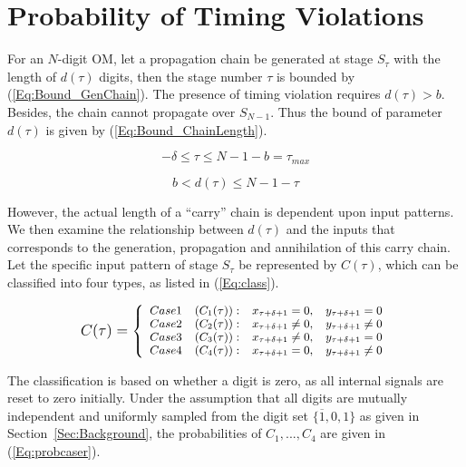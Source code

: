 \documentclass[journal]{IEEEtran}
\begin{document}
\section{Probability of Timing Violations}\label{section:Prob}

For an $N$-digit OM, let a propagation chain be generated at stage $S_{\tau}$ with the length of $d(\tau)$ digits, then the stage number $\tau$ is bounded by (\ref{Eq:Bound_GenChain}). The presence of timing violation requires $d(\tau)>b$. Besides, the chain cannot propagate over $S_{N-1}$. Thus the bound of parameter $d(\tau)$ is given by (\ref{Eq:Bound_ChainLength}).


\begin{equation}\label{Eq:Bound_GenChain}
 -\delta\leq \tau\leq N-1-b=\tau_{max}
\end{equation}


\begin{equation}\label{Eq:Bound_ChainLength}
  b<d(\tau)\leq N-1-\tau
\end{equation}
%


\noindent However, the actual length of a ``carry'' chain is dependent upon input patterns. We then examine the relationship between $d(\tau)$ and the inputs that corresponds to the generation, propagation and annihilation of this carry chain.  Let the specific input pattern of stage $S_{\tau}$ be represented by $C(\tau)$, which can be classified into four types, as listed in (\ref{Eq:class}). 

\begin{equation}\label{Eq:class}
\footnotesize
    C(\tau)= \left\{ \begin{array}{llll}
        Case 1 & (C_1(\tau)): & x_{\tau +\delta+1}=0, & y_{\tau +\delta+1}=0\\
        Case 2 & (C_2(\tau)): & x_{\tau +\delta+1}\neq 0, & y_{\tau +\delta+1}\neq 0\\
        Case 3 & (C_3(\tau)): & x_{\tau +\delta+1}\neq 0, & y_{\tau +\delta+1}=0\\
        Case 4 & (C_4(\tau)): & x_{\tau +\delta+1}=0, & y_{\tau +\delta+1}\neq 0
\end{array} \right.
\normalsize
\end{equation}

\noindent The classification is based on whether a digit is zero, as all internal signals are reset to zero initially. Under the assumption that all digits are mutually independent and uniformly sampled from the digit set  $\{\overline{1},0,1\}$ as given in Section~\ref{Sec:Background}, the probabilities of $C_1,...,C_4$ are given in (\ref{Eq:probcaser}).
\end{document}
